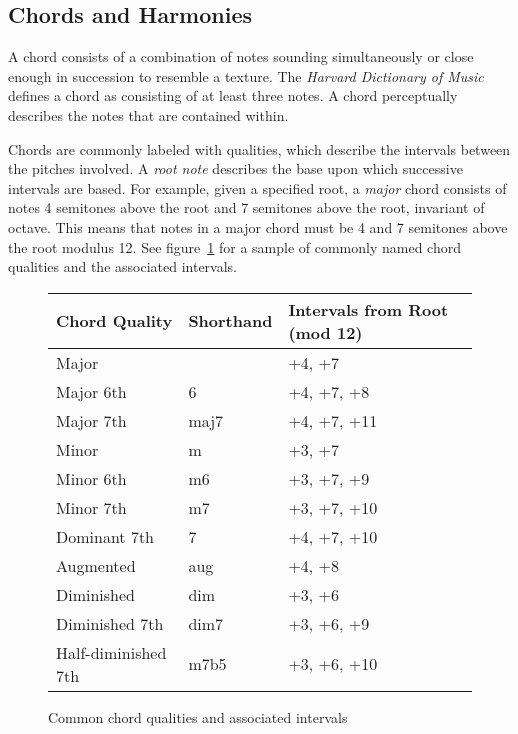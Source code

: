 \subsection{Chords and Harmonies}

A chord consists of a combination of notes sounding simultaneously or close enough in succession to resemble a texture. The \textit{Harvard Dictionary of Music} defines a chord as consisting of at least three notes\cite{harvdict}. A chord perceptually describes the notes that are contained within.

Chords are commonly labeled with qualities, which describe the intervals between the pitches involved. A \textit{root note} describes the base upon which successive intervals are based. For example, given a specified root, a \textit{major} chord consists of notes 4 semitones above the root and 7 semitones above the root, invariant of octave. This means that notes in a major chord must be 4 and 7 semitones above the root modulus 12. See figure~\ref{fig:qualitytable} for a sample of commonly named chord qualities and the associated intervals. \\

\begin{figure}[h!]
\begin{center}
\begin{tabular}{lll}
\toprule
Chord Quality       & Shorthand & Intervals from Root (mod 12) \\
\midrule
Major               &           & +4, +7     \\
Major 6th           & 6         & +4, +7, +8 \\
Major 7th           & maj7      & +4, +7, +11\\
Minor               & m         & +3, +7     \\
Minor 6th           & m6        & +3, +7, +9 \\
Minor 7th           & m7        & +3, +7, +10\\
Dominant 7th        & 7         & +4, +7, +10\\
Augmented           & aug       & +4, +8     \\
Diminished          & dim       & +3, +6     \\
Diminished 7th      & dim7      & +3, +6, +9 \\
Half-diminished 7th & m7b5      & +3, +6, +10\\
\bottomrule
\end{tabular}
\caption{Common chord qualities and associated intervals}
\label{fig:qualitytable}
\end{center}
\end{figure}

